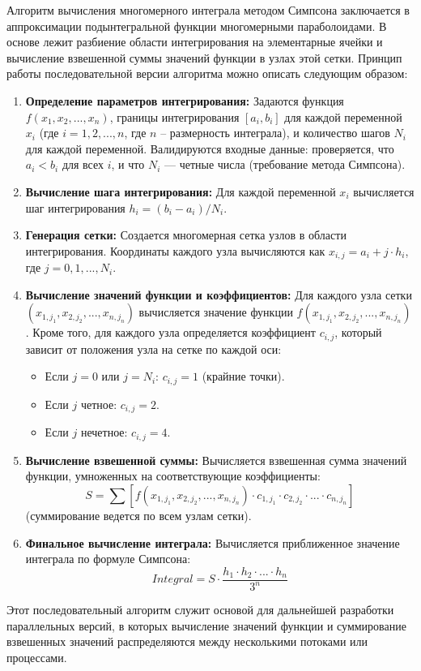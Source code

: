 \documentclass[12pt]{article}
\begin{document}
\hspace*{1.35em}Алгоритм вычисления многомерного интеграла методом Симпсона заключается в аппроксимации подынтегральной функции многомерными параболоидами. В основе лежит разбиение области интегрирования на элементарные ячейки и вычисление взвешенной суммы значений функции в узлах этой сетки.
Принцип работы последовательной версии алгоритма можно описать следующим образом:
\begin{enumerate}
    \item \textbf{Определение параметров интегрирования:} Задаются функция $f(x_1, x_2, ..., x_n)$, границы интегрирования $[a_i, b_i]$ для каждой переменной $x_i$ (где $i = 1, 2, ..., n$, где $n$ – размерность интеграла), и количество шагов $N_i$ для каждой переменной. Валидируются входные данные: проверяется, что $a_i < b_i$ для всех $i$, и что $N_i$ — четные числа (требование метода Симпсона).
    \item \textbf{Вычисление шага интегрирования:} Для каждой переменной $x_i$ вычисляется шаг интегрирования $h_i = (b_i - a_i) / N_i$.
    \item \textbf{Генерация сетки:} Создается многомерная сетка узлов в области интегрирования. Координаты каждого узла вычисляются как $x_{i,j} = a_i + j \cdot h_i$, где $j = 0, 1, ..., N_i$.
    \item \textbf{Вычисление значений функции и коэффициентов:} Для каждого узла сетки $(x_{1,j_1}, x_{2,j_2}, ..., x_{n,j_n})$ вычисляется значение функции $f(x_{1,j_1}, x_{2,j_2}, ..., x_{n,j_n})$. Кроме того, для каждого узла определяется коэффициент $c_{i,j}$, который зависит от положения узла на сетке по каждой оси:
    \begin{itemize}
        \item Если $j = 0$ или $j = N_i$: $c_{i,j} = 1$ (крайние точки).
        \item Если $j$ четное: $c_{i,j} = 2$.
        \item Если $j$ нечетное: $c_{i,j} = 4$.
    \end{itemize}
    \item \textbf{Вычисление взвешенной суммы:} Вычисляется взвешенная сумма значений функции, умноженных на соответствующие коэффициенты:
    $$S = \sum [f(x_{1,j_1}, x_{2,j_2}, ..., x_{n,j_n}) \cdot c_{1,j_1} \cdot c_{2,j_2} \cdot ... \cdot c_{n,j_n}]$$
    (суммирование ведется по всем узлам сетки).
    \item \textbf{Финальное вычисление интеграла:} Вычисляется приближенное значение интеграла по формуле Симпсона:
    $$Integral = S \cdot \frac{h_1 \cdot h_2 \cdot ... \cdot h_n}{3^n}$$
\end{enumerate}
Этот последовательный алгоритм служит основой для дальнейшей разработки параллельных версий, в которых вычисление значений функции и суммирование взвешенных значений распределяются между несколькими потоками или процессами.
\end{document}
